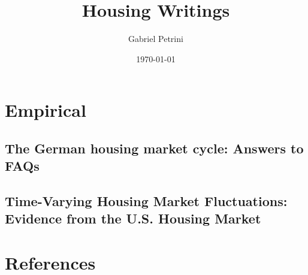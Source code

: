 \documentclass[11pt]{article}
\author{Gabriel Petrini}
\date{\today}
\title{Housing Writings}
\begin{document}
\maketitle
\tableofcontents





\section{Empirical}
\label{sec:orge32ae80}
\subsection{\textcite{kajuthgerman2020} The German housing market cycle: Answers to FAQs}
\label{sec:orgae16392}

\cite{kajuthgerman2020}

\subsection{\citet{Ozdemir2020} Time-Varying Housing Market Fluctuations: Evidence from the U.S. Housing Market}
\label{sec:orgc30b243}

\section*{References}
\label{sec:orgca94cda}
\printbibliography[heading=none]
\end{document}
